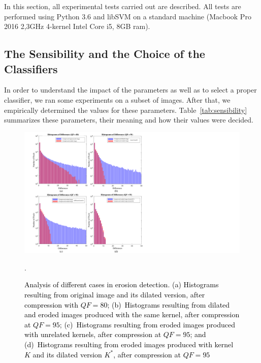 \documentclass{ieeeaccess}
\newcommand{\revisedtext}[1]{\textcolor{black}{#1}}
\begin{document}
In this section, all experimental tests carried out are described. 
All  tests are performed using Python 3.6 and libSVM on a standard machine (Macbook Pro 2016 2,3GHz 4-kernel Intel Core i5, 8GB ram).

\subsection{The Sensibility and the Choice of the Classifiers}
\label{subsec:sensibity}

In order to understand the impact of the parameters as well as to select a proper classifier, we ran some experiments on a subset of images. After that, we empirically determined the values for these parameters. Table~\ref{tab:sensibility} summarizes these parameters, their meaning and how their values were decided.
\begin{figure}[h!]
	\centering
	\includegraphics[width=0.8\linewidth]{morp_cases}
	\caption{\revisedtext{Analysis of different cases in erosion detection. (a) Histograms resulting from  original image and its dilated version, after compression with $QF= 80$; (b)~Histograms resulting from dilated and eroded images produced with the same kernel, after compression at $QF=95$;
		(c)~Histograms resulting from eroded images produced with unrelated kernels, after compression at $QF=95$; and
		(d)~Histograms resulting from eroded images produced with kernel $K$ and its dilated version $K^*$, after compression at $QF=95$}}.
	\label{fig:morp_cases}
\end{figure}
\end{document}
